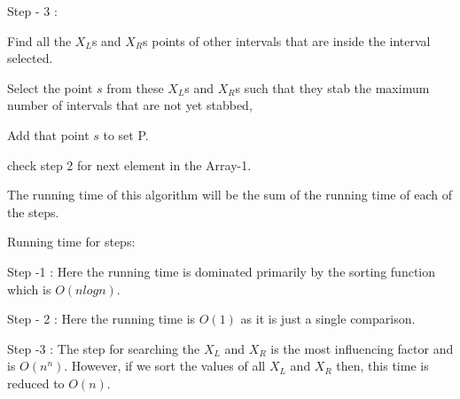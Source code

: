 \documentclass[letterpaper,portrait,12pt]{article}
\begin{document}
\begin{flushleft}

\end{flushleft}


\begin{flushleft}
Step - 3 : 
\end{flushleft}


\begin{flushleft}
	Find all the $X_L$s and $X_R$s points of other intervals that are inside the interval selected.
\end{flushleft}


\begin{flushleft}
	Select the point $s$ from these $X_L $s and $X_R$s such that they stab the maximum number of intervals that are not yet stabbed, 
\end{flushleft}


\begin{flushleft}
	Add that point $s$ to set P.
\end{flushleft}


\begin{flushleft}
	check step 2 for next element in the Array-1.
\end{flushleft}


\begin{flushleft}

\end{flushleft}


\begin{flushleft}
The running time of this algorithm will be the sum of the running time of each of the steps.
\end{flushleft}


\begin{flushleft}
Running time for steps:
\end{flushleft}


\begin{flushleft}
Step -1  : Here the running time is dominated primarily by the sorting function which is $O(nlogn)$.
\end{flushleft}


\begin{flushleft}
Step - 2 : Here the running time is $O(1)$ as it is just a single comparison.
\end{flushleft}


\begin{flushleft}
Step -3 : The step for searching the $X_L $ and $X_R$ is the most influencing factor and is $O(n^n)$. However, if we sort the values of all $X_L$ and $X_R$ then, this time is reduced to $O(n)$.
\end{flushleft}
\end{document}

